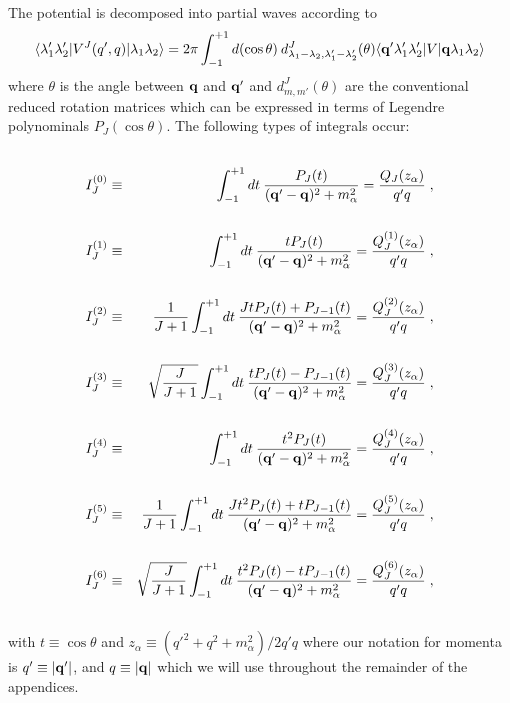 The potential is decomposed into partial waves according to
\begin{eqnarray}
\langle \lambda_1' \lambda_2' |V^J(q',q)| \lambda_1 \lambda_2 \rangle =
2\pi \int^{+1}_{-1} d(\cos \theta)\: d^J_{\lambda_1-\lambda_2, 
\lambda_1'-\lambda_2'}(\theta)
\langle {\bf  q}'\lambda_1'\lambda_2'|V|{\bf  q}\lambda_1\lambda_2\rangle
\nonumber \\ \label{32.1}
\end{eqnarray}
where $\theta$ is the angle between ${\bf  q}$ and ${\bf  q}'$ and
$d^J_{m,m'}(\theta)$ are the conventional reduced rotation matrices
which can be expressed in terms of Legendre 
polynominals $P_J(\cos \theta)$. 
The following types of integrals occur:
\begin{eqnarray}
\nonumber \\ 
I^{(0)}_J & \equiv &
\int_{-1}^{+1} dt\: 
\frac{P_J(t)}{({\bf  q}'-{\bf  q})^2+m^2_\alpha}
 = \frac{Q_J(z_\alpha)}{q'q}
\; ,
\label{32.21} \\
\nonumber \\ 
I^{(1)}_J & \equiv &
\int_{-1}^{+1} dt\: \frac{ t P_J(t)}{({\bf  q}'-{\bf  q})^2+m^2_\alpha}
 = \frac{Q_J^{(1)}(z_\alpha)}{q'q}
\; ,
\label{32.22} \\
\nonumber \\
I^{(2)}_J & \equiv & \frac{1}{J+1}
\int_{-1}^{+1} dt\: \frac{J t P_J(t)+P_{J-1}(t)}{({\bf  q}'-{\bf  q})^2+m^2_\alpha}
 = \frac{Q_J^{(2)}(z_\alpha)}{q'q}
\; ,
\label{32.23} \\
\nonumber \\
I^{(3)}_J & \equiv & \sqrt{\frac{J}{J+1}}
\int_{-1}^{+1} dt\: \frac{ t P_J(t)-P_{J-1}(t)}{({\bf  q}'-{\bf  q})^2+m^2_\alpha}
 = \frac{Q_J^{(3)}(z_\alpha)}{q'q}
\; ,
\label{32.24} \\
\nonumber \\ 
I^{(4)}_J & \equiv &
\int_{-1}^{+1} dt\: \frac{ t^2 P_J(t)}{({\bf  q}'-{\bf  q})^2+m^2_\alpha}
 = \frac{Q_J^{(4)}(z_\alpha)}{q'q}
\; ,
\label{32.25} \\
\nonumber \\
I^{(5)}_J & \equiv & \frac{1}{J+1}
\int_{-1}^{+1} dt\: \frac{J t^2 P_J(t) + t P_{J-1}(t)}
{({\bf  q}'-{\bf  q})^2+m^2_\alpha}
 = \frac{Q_J^{(5)}(z_\alpha)}{q'q}
\; ,
\label{32.26} \\
\nonumber \\
I^{(6)}_J & \equiv & \sqrt{\frac{J}{J+1}}
\int_{-1}^{+1} dt\: \frac{ t^2 P_J(t) - t P_{J-1}(t)}
{({\bf  q}'-{\bf  q})^2+m^2_\alpha}
 = \frac{Q_J^{(6)}(z_\alpha)}{q'q}
\; ,
\label{32.27} \\
\nonumber
\end{eqnarray}
with $t\equiv\cos \theta$ and
$z_\alpha \equiv (q'^2 + q^2 + m_\alpha^2)/2q'q$ 
where our notation for momenta is
$q'\equiv |{\bf q}'|$, and $q\equiv |{\bf q}|$
which we will use throughout the remainder of the appendices.

